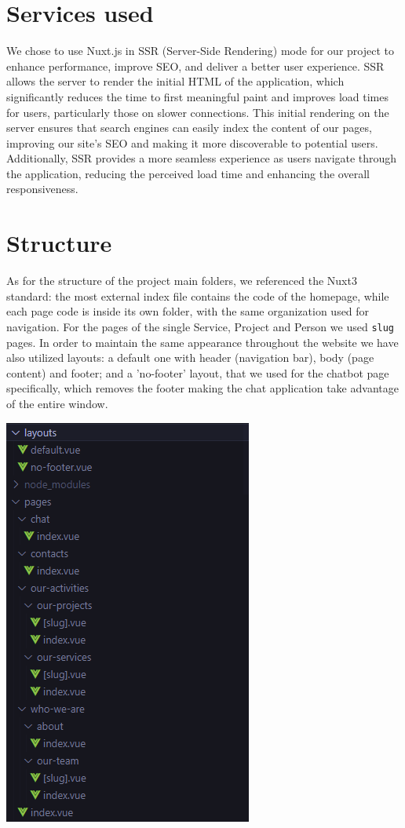 \section{Services used}
We chose to use Nuxt.js in SSR (Server-Side Rendering) mode for our project to enhance performance, improve SEO, and deliver a better user experience.
SSR allows the server to render the initial HTML of the application, which significantly reduces the time to first meaningful paint and improves load times for users, particularly those on slower connections.
This initial rendering on the server ensures that search engines can easily index the content of our pages, improving our site's SEO and making it more discoverable to potential users.
Additionally, SSR provides a more seamless experience as users navigate through the application, reducing the perceived load time and enhancing the overall responsiveness.

\section{Structure}
As for the structure of the project main folders, we referenced the Nuxt3 standard: the most external index file
contains the code of the homepage, while each page code is inside its own folder, with the same organization used for navigation.
For the pages of the single Service, Project and Person we used \texttt{slug} pages.
In order to maintain the same appearance throughout the website we have also utilized layouts: a default one with header (navigation bar), body (page content) and footer;
and a 'no-footer' layout, that we used for the chatbot page specifically, which removes the footer making the chat application take advantage of the entire window.


\begin{center}
    \includegraphics[width=0.4\linewidth]{img/folders-structure.png}
\end{center}

